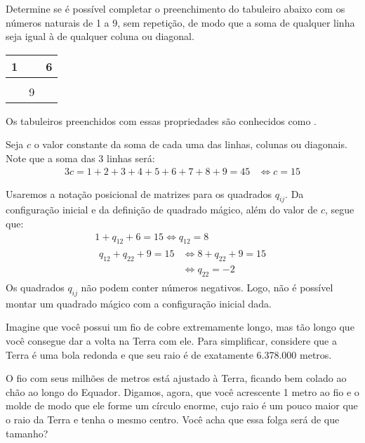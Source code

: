 \begin{example}
\label{ex:quadrado-magico-3x3}
Determine se é possível completar o preenchimento do tabuleiro abaixo com os números naturais de 1 a 9, sem repetição, de modo que a soma de qualquer linha seja igual à de qualquer coluna ou diagonal.

\begin{center}
\begin{tabular}{|c|c|c|}
  \hline
  1 &   & 6 \\ \hline
    &   &   \\ \hline
    & 9 &   \\
  \hline
\end{tabular}
\end{center}
Os tabuleiros preenchidos com essas propriedades são conhecidos como .
\end{example}

\begin{solution}
Seja $c$ o valor constante da soma de cada uma das linhas, colunas ou diagonais. Note que a soma das 3 linhas será:
%
\begin{align*}
3c = 1+2+3+4+5+6+7+8+9=45 & \iff c =15
\end{align*}

Usaremos a notação posicional de matrizes para os quadrados $q_{ij}$. Da configuração inicial e da definição de quadrado mágico, além do valor de $c$, segue que:
%
\begin{gather*}
    1+q_{12}+6=15  \iff q_{12} = 8 \\
    \begin{aligned}
            q_{12} + q_{22} + 9= 15 & \iff 8+q_{22} + 9= 15\\
            & \iff q_{22} = -2
    \end{aligned}
\end{gather*}
%
\noindent Os quadrados $q_{ij}$ não podem conter números negativos. Logo, não é possível montar um quadrado mágico com a configuração inicial dada.
\end{solution}

\begin{example}
\label{ex:fio-terra}
Imagine que você possui um fio de cobre extremamente longo, mas tão longo que você consegue dar a volta na Terra com ele. Para simplificar, considere que a Terra é uma bola redonda e que seu raio é de exatamente 6.378.000 metros.

O fio com seus milhões de metros está ajustado à Terra, ficando bem colado ao chão ao longo do Equador. Digamos, agora, que você acrescente 1 metro ao fio e o molde de modo que ele forme um círculo enorme, cujo raio é um pouco maior que o raio da Terra e tenha o mesmo centro. Você acha que essa folga será de que tamanho?
\end{example}

